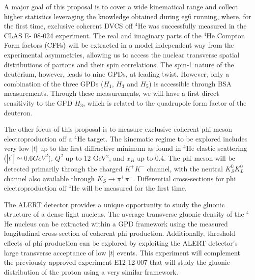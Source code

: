 A major goal of this proposal is to cover a wide kinematical range and collect
higher statistics leveraging the knowledge obtained during eg6 running, where, for the
first time, exclusive coherent DVCS off $^4$He was successfully measured in the CLAS E-
08-024 experiment. The real and imaginary parts of the $^4$He Compton Form factors
(CFFs) will be extracted in a model independent way from the experimental
asymmetries, allowing us to access the nuclear transverse spatial distributions of
partons and their spin correlations. The spin-1 nature of the deuterium, however, leads
to nine GPDs, at leading twist. However, only a combination of the three GPDs ($H_1$, $H_3$
and $H_5$) is accessible through BSA measurements. Through these measurements, we
will have a first direct sensitivity to the GPD $H_3$, which is related to the quadrupole form
factor of the deuteron.


The other focus of this proposal is to measure exclusive coherent phi meson
electroproduction off a $^4$He target. The kinematic regime to be explored includes very low
$|t|$ up to the first diffractive minimum as found in $^4$He elastic 
scattering ($|t^\prime| \simeq 0.6 GeV^2$), $Q^2$
up to 12 GeV$^2$, and $x_B$ up to 0.4. The phi meson will be detected primarily through the
charged $K^+ K^-$ channel, with the neutral $K^0_S K^0_L$ channel also available through
$K_S \rightarrow \pi^+ \pi^-$. Differential cross-sections for phi electroproduction off $^4$He will be
measured for the first time.

The ALERT detector provides a unique opportunity to study the gluonic structure
of a dense light nucleus. The average transverse gluonic density of the $^4$He nucleus can
be extracted within a GPD framework using the measured longitudinal cross-section of
coherent phi production. Additionally, threshold effects of phi production can be explored
by exploiting the ALERT detector's large transverse acceptance of low $|t|$ events. This
experiment will complement the previously approved experiment E12-12-007 that will
study the gluonic distribution of the proton using a very similar framework.

\newpage

